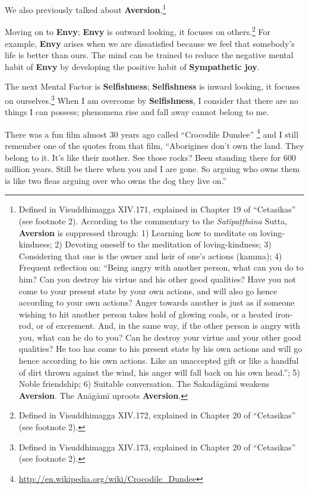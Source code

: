We also previously talked about \textbf{Aversion}.\footnote{Defined in Visuddhimagga XIV.171, explained in Chapter 19 of “Cetasikas” (see footnote 2). According to the commentary to the \textit{Satipaṭṭhāna} Sutta, \textbf{Aversion} is suppressed through: 1) Learning how to meditate on loving-kindness; 2) Devoting oneself to the meditation of loving-kindness; 3) Considering that one is the owner and heir of one’s actions (kamma); 4) Frequent reflection on: “Being angry with another person, what can you do to him? Can you destroy his virtue and his other good qualities? Have you not come to your present state by your own actions, and will also go hence according to your own actions? Anger towards another is just as if someone wishing to hit another person takes hold of glowing coals, or a heated iron-rod, or of excrement. And, in the same way, if the other person is angry with you, what can he do to you? Can he destroy your virtue and your other good qualities? He too has come to his present state by his own actions and will go hence according to his own actions. Like an unaccepted gift or like a handful of dirt thrown against the wind, his anger will fall back on his own head.”; 5) Noble friendship; 6) Suitable conversation. The Sakadāgāmī weakens \textbf{Aversion}. The Anāgāmī uproots \textbf{Aversion}.}

Moving on to \textbf{Envy}; \textbf{Envy} is outward looking, it focuses on others.\footnote{Defined in Visuddhimagga XIV.172, explained in Chapter 20 of “Cetasikas” (see footnote 2).} For example, \textbf{Envy} arises when we are dissatisfied because we feel that somebody’s life is better than ours. The mind can be trained to reduce the negative mental habit of \textbf{Envy} by developing the positive habit of \textbf{Sympathetic joy}.

The next Mental Factor is \textbf{Selfishness}; \textbf{Selfishness} is inward looking, it focuses on ourselves.\footnote{Defined in Visuddhimagga XIV.173, explained in Chapter 20 of “Cetasikas” (see footnote 2).} When I am overcome by \textbf{Selfishness}, I consider that there are no things I can possess; phenomena rise and fall away cannot belong to me.

There was a fun film almost 30 years ago called “Crocodile Dundee” \footnote{\url{http://en.wikipedia.org/wiki/Crocodile_Dundee}} and I still remember one of the quotes from that film, “Aborigines don’t own the land. They belong to it. It’s like their mother. See those rocks? Been standing there for 600 million years. Still be there when you and I are gone. So arguing who owns them is like two fleas arguing over who owns the dog they live on.”

